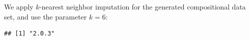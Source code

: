 \documentclass{scrartcl}
\begin{document}

%
%
%
%
%
%







We apply $k$-nearest neighbor imputation for the generated compositional data
set, and use the parameter $k=6$:

\begin{knitrout}
\color{fgcolor}\begin{kframe}
\begin{alltt}
\hlstd{(}\hlstd{)}
\hlstd{(}\hlstd{)}\hlopt{$}
\end{alltt}
\begin{verbatim}
## [1] "2.0.3"
\end{verbatim}
\begin{alltt}
 \hlkwb{<-} \hlopt{$} \hlstd{=}\hlstd{)}
\end{alltt}
\end{kframe}
\end{knitrout}
\end{document}
